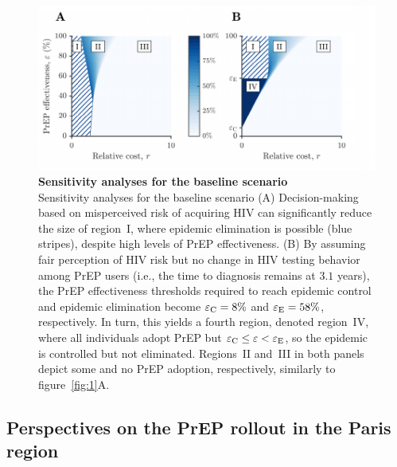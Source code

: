\documentclass[preprint,review,12pt]{article}			%
\begin{document}
\begin{figure}[H]
	\centering	
	\includegraphics{Figures/Fig_3}
	\caption{{\bf Sensitivity analyses for the baseline scenario}\\
	Sensitivity analyses for the baseline scenario
(A) Decision-making based on misperceived risk of acquiring HIV can significantly reduce the size of region~I, where epidemic elimination is possible (blue stripes), despite high levels of PrEP effectiveness. (B) By assuming fair perception of HIV risk but no change in HIV testing behavior among PrEP users (i.e., the time to diagnosis remains at $3.1$ years), the PrEP effectiveness thresholds required to reach epidemic control and epidemic elimination become $\varepsilon_{\rm C} = 8\%$ and $\varepsilon_{\rm E} = 58\%$, respectively. In turn, this yields a fourth region, denoted region~IV, where all individuals adopt PrEP but $\varepsilon_{\rm C} \leq \varepsilon<\varepsilon_{\rm E}$, so the epidemic is controlled but not eliminated. Regions~II and~III in both panels depict some and no PrEP adoption, respectively, similarly to figure~\ref{fig:1}A.
	}
	\label{fig:3}
\end{figure}

\subsection{Perspectives on the PrEP rollout in the Paris region} \label{subsec:ParisPerspectives}
\end{document}
